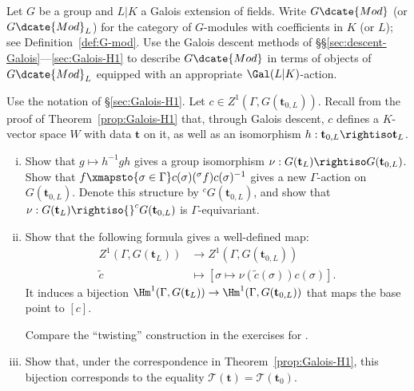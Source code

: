	\item Let $G$ be a group and $L|K$ a Galois extension of fields. Write
	$G\dcate{Mod}$ (or $G\dcate{Mod}_L$) for the category of $G$-modules with
	coefficients in $K$ (or $L$); see Definition~\ref{def:G-mod}. Use the
	Galois descent methods of
	\S\S\ref{sec:descent-Galois}---\ref{sec:Galois-H1} to describe
	$G\dcate{Mod}$ in terms of objects of $G\dcate{Mod}_L$ equipped with an
	appropriate $\Gal(L|K)$-action.

	\item Use the notation of \S\ref{sec:Galois-H1}. Let
	$c\in Z^1(\Gamma,G(\mathbf{t}_{0,L}))$. Recall from the proof of
	Theorem~\ref{prop:Galois-H1} that, through Galois descent, $c$ defines a
	$K$-vector space $W$ with data $\mathbf{t}$ on it, as well as an
	isomorphism $h:\mathbf{t}_{0,L}\rightiso\mathbf{t}_L$.
	\begin{enumerate}[(i)]
		\item Show that $g\mapsto h^{-1}gh$ gives a group isomorphism
		$\nu:G(\mathbf{t}_L)\rightiso G(\mathbf{t}_{0,L})$. Show that
		$ f \xmapsto{\sigma \in \Gamma} c(\sigma)({}^\sigma f)c(\sigma)^{-1} $
		gives a new $\Gamma$-action on $G(\mathbf{t}_{0,L})$. Denote this
		structure by ${}^cG(\mathbf{t}_{0,L})$, and show that
		$\nu:G(\mathbf{t}_L)\rightiso{}^cG(\mathbf{t}_{0,L})$ is
		$\Gamma$-equivariant.

		\item Show that the following formula gives a well-defined map:
		\begin{align*}
			Z^1(\Gamma, G(\mathbf{t}_L)) & \to Z^1(\Gamma, G(\mathbf{t}_{0, L})) \\
			\tilde{c} & \mapsto \left[\sigma \mapsto \nu(\tilde{c}(\sigma)) c(\sigma) \right].
		\end{align*}
		It induces a bijection
		$\Hm^1(\Gamma,G(\mathbf{t}_L))\to
		\Hm^1(\Gamma,G(\mathbf{t}_{0,L}))$ that maps the base point to $[c]$.
		\begin{hint}
			Compare the ``twisting'' construction in the exercises for
			.
		\end{hint}

		\item Show that, under the correspondence in
		Theorem~\ref{prop:Galois-H1}, this bijection corresponds to the equality
		$\mathscr{T}(\mathbf{t})=\mathscr{T}(\mathbf{t}_0)$.
	\end{enumerate}

